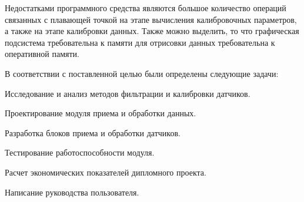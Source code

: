 Недостатками программного средства являются большое количество операций связанных с плавающей точкой на этапе вычисления калибровочных параметров,
а также на этапе калибровки данных. Также можно выделить, то что графическая подсистема требовательна к памяти для отрисовки данных требовательна
к оперативной памяти.   

В соответствии с поставленной целью были определены следующие задачи:
\begin{enumerate_num}
    \item Исследование и анализ методов фильтрации и калибровки датчиков.
    \item Проектирование модуля приема и обработки данных.
    \item Разработка блоков приема и обработки датчиков.
    \item Тестирование работоспособности модуля.
    \item Расчет экономических показателей дипломного проекта.
    \item Написание руководства пользователя.
\end{enumerate_num}
